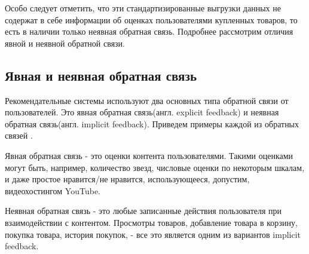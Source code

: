 \documentclass[14pt]{mmcs_article}
\begin{document}
Особо следует отметить, что эти стандартизированные выгрузки данных не содержат в себе информации об оценках пользователями купленных товаров, то есть в наличии только неявная обратная связь. Подробнее рассмотрим отличия явной и неявной обратной связи.

\subsection{Явная и неявная обратная связь}
Рекомендательные системы используют два основных типа обратной связи от пользователей. Это явная обратная связь(англ. explicit feedback) и неявная обратная связь(англ. implicit feedback). Приведем примеры каждой из обратных связей \cite{stud:kimfalk1}.


Явная обратная связь - это оценки контента пользователями. Такими оценками могут быть, например, количество звезд, числовые оценки по некоторым шкалам, и даже простое нравится/не нравится, использующееся, допустим, видеохостингом YouTube. \cite{stud:kimfalk1}

Неявная обратная связь - это любые записанные действия пользователя при взаимодействии с контентом. Просмотры товаров, добавление товара в корзину, покупка товара, история покупок, - все это является одним из вариантов implicit feedback. 
\end{document}

